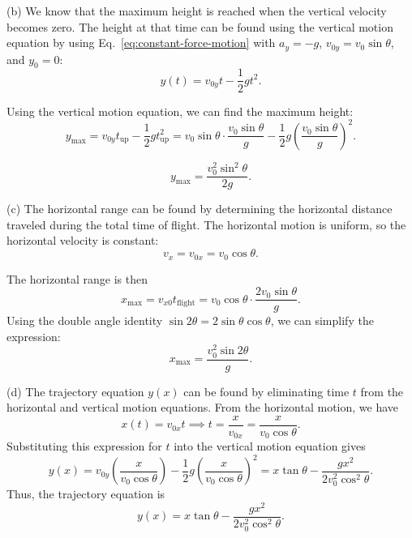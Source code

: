 \documentclass[12pt]{article}
\begin{document}
(b) We know that the maximum height is reached when the vertical velocity becomes zero. The height at that time can be found using the vertical motion equation by using Eq.~\eqref{eq:constant-force-motion} with $a_y = -g$, $v_{0y} = v_0 \sin \theta$, and $y_0 = 0$:
\begin{equation}
y(t) = v_{0y} t - \frac{1}{2} g t^2.
\end{equation}


Using the vertical motion equation, we can find the maximum height:
\begin{equation}
y_{\text{max}} = v_{0y} t_{\text{up}} - \frac{1}{2} g t_{\text{up}}^2 = v_0 \sin \theta \cdot \frac{v_0 \sin \theta}{g} - \frac{1}{2} g \left(\frac{v_0 \sin \theta}{g}\right)^2.
\end{equation}

\begin{equation}
    \boxed{
y_{\text{max}} = \frac{v_0^2 \sin^2 \theta}{2g}}.
\end{equation}

(c) The horizontal range can be found by determining the horizontal distance traveled during the total time of flight. The horizontal motion is uniform, so the horizontal velocity is constant:
\begin{equation}
v_x = v_{0x} = v_0 \cos \theta.
\end{equation}

The horizontal range is then
\begin{equation}
    x_{\text{max}} = v_{x0} t_{\text{flight}} = v_0 \cos \theta \cdot \frac{2 v_0 \sin \theta}{g}.
\end{equation}
Using the double angle identity $\sin 2\theta = 2 \sin \theta \cos \theta$, we can simplify the expression:
\begin{equation}
    \boxed{x_{\text{max}} = \frac{v_0^2 \sin 2\theta}{g}}.
\end{equation}

(d) The trajectory equation $y(x)$ can be found by eliminating time $t$ from the horizontal and vertical motion equations. From the horizontal motion, we have
\begin{equation}
x(t) = v_{0x} t \implies t = \frac{x}{v_{0x}} = \frac{x}{v_0 \cos \theta}.
\end{equation}
Substituting this expression for $t$ into the vertical motion equation gives
\begin{equation}
y(x) = v_{0y} \left(\frac{x}{v_0 \cos \theta}\right) - \frac{1}{2} g \left(\frac{x}{v_0 \cos \theta}\right)^2 = x \tan \theta - \frac{g x^2}{2 v_0^2 \cos^2 \theta}.
\end{equation}
Thus, the trajectory equation is
\begin{equation}
    \boxed{y(x) = x \tan \theta - \frac{g x^2}{2 v_0^2 \cos^2 \theta}}.
\end{equation}
\end{document}
